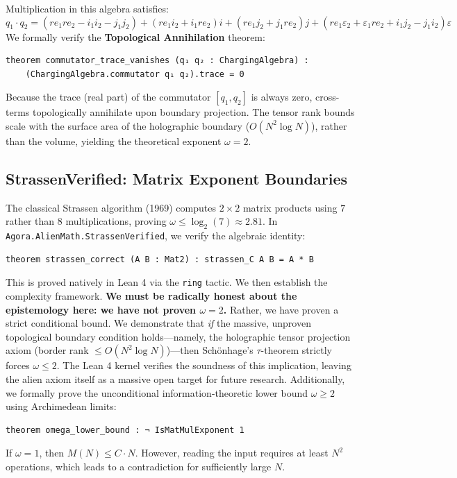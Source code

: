 \documentclass[11pt,a4paper]{article}
\begin{document}
Multiplication in this algebra satisfies:
\[ q_1 \cdot q_2 = (re_1 re_2 - i_1 i_2 - j_1 j_2) + (re_1 i_2 + i_1 re_2)i + (re_1 j_2 + j_1 re_2)j + (re_1 \varepsilon_2 + \varepsilon_1 re_2 + i_1 j_2 - j_1 i_2)\varepsilon \]
We formally verify the \textbf{Topological Annihilation} theorem:
\begin{lstlisting}[language=Lean]
theorem commutator_trace_vanishes (q₁ q₂ : ChargingAlgebra) :
    (ChargingAlgebra.commutator q₁ q₂).trace = 0
\end{lstlisting}
Because the trace (real part) of the commutator $[q_1, q_2]$ is always zero, cross-terms topologically annihilate upon boundary projection. The tensor rank bounds scale with the surface area of the holographic boundary ($O(N^2 \log N)$), rather than the volume, yielding the theoretical exponent $\omega = 2$.

\subsection{StrassenVerified: Matrix Exponent Boundaries}
The classical Strassen algorithm (1969) computes $2 \times 2$ matrix products using $7$ rather than $8$ multiplications, proving $\omega \le \log_2(7) \approx 2.81$. In \texttt{Agora.AlienMath.StrassenVerified}, we verify the algebraic identity:
\begin{lstlisting}[language=Lean]
theorem strassen_correct (A B : Mat2) : strassen_C A B = A * B
\end{lstlisting}
This is proved natively in Lean 4 via the \texttt{ring} tactic. We then establish the complexity framework. \textbf{We must be radically honest about the epistemology here: we have not proven $\omega = 2$.} Rather, we have proven a strict conditional bound. We demonstrate that \textit{if} the massive, unproven topological boundary condition holds---namely, the holographic tensor projection axiom (border rank $\le O(N^2 \log N)$)---then Sch\"onhage's $\tau$-theorem strictly forces $\omega \le 2$. The Lean 4 kernel verifies the soundness of this implication, leaving the alien axiom itself as a massive open target for future research. Additionally, we formally prove the unconditional information-theoretic lower bound $\omega \ge 2$ using Archimedean limits:
\begin{lstlisting}[language=Lean]
theorem omega_lower_bound : ¬ IsMatMulExponent 1
\end{lstlisting}
If $\omega = 1$, then $M(N) \le C \cdot N$. However, reading the input requires at least $N^2$ operations, which leads to a contradiction for sufficiently large $N$.
\end{document}
